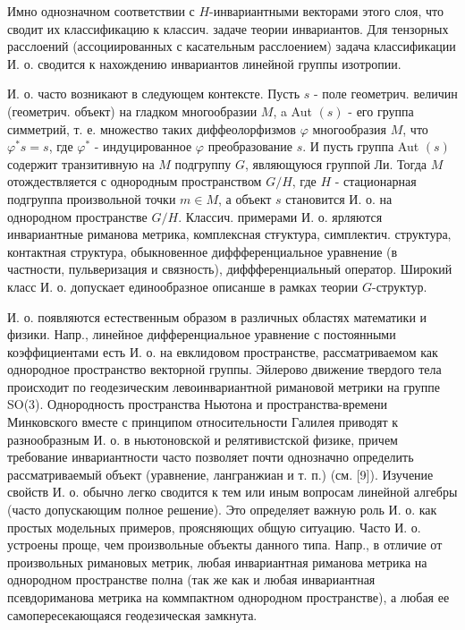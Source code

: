 \documentclass[10pt]{article}
\begin{document}
Имно однозначном соответствии с $H$-инвариантными векторами этого слоя, что сводит их классификацию к классич. задаче теории инвариантов. Для тензорных расслоений (ассоциированных с касательным расслоением) задача классификации И. о. сводится к нахождению инвариантов линейной группы изотропии.



И. о. часто возникают в следующем контексте. Пусть $s$ - поле геометрич. величин (геометрич. объект) на гладком многообразии $M$, a Aut $(s)$ - его группа симметрий, т. е. множество таких диффеолорфизмов $\varphi$ многообразия $M$, что $\varphi^{*} s=s$, где $\varphi^{*}$ - индуцированное $\varphi$ преобразование $s$. И пусть группа Aut $(s)$ содержит транзитивную на $M$ подгруппу $G$, являющуюся группой Ли. Тогда $M$ отождествляется с однородным пространством $G / H$, где $H$ - стационарная подгруппа произвольной точки $m \in M$, а объект $s$ становится И. о. на однородном пространстве $G / H$. Классич. примерами И. о. ярляются инвариантные риманова метрика, комплексная стғуктура, симплектич. структура, контактная структура, обыкновенное диффференциальное уравнение (в частности, пульверизация и связность), диффференциальный оператор. Широкий класс И. о. допускает единообразное описанше в рамках теории $G$-структур.



И. о. появляются естественным образом в различных областях математики и физики. Напр., линейное дифференциальное уравнение с постоянными коэффициентами есть И. о. на евклидовом пространстве, рассматриваемом как однородное пространство векторной группы. Эйлерово движение твердого тела происходит по геодезическим левоинвариантной римановой метрики на группе SO(3). Однородность пространства Ньютона и пространства-времени Минковского вместе с принципом относительности Галилея приводят к разнообразным И. о. в ньютоновской и релятивистской физике, причем требование инвариантности часто позволяет почти однозначно определить рассматриваемый объект (уравнение, лангранжиан и т. п.) (см. [9]). Изучение свойств И. о. обычно легко сводится к тем или иным вопросам линейной алгебры (часто допускающим полное решение). Это определяет важную роль И. о. как простых модельных примеров, проясняющих общую ситуацию. Часто И. о. устроены проще, чем произвольные объекты данного типа. Напр., в отличие от произвольных римановых метрик, любая инвариантная риманова метрика на однородном пространстве полна (так же как и любая инвариантная псевдориманова метрика на коммпактном однородном пространстве), а любая ее самопересекающаяся геодезическая замкнута.
\end{document}
